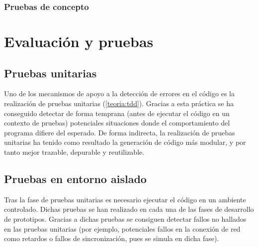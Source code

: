 

\subsubsection{Pruebas de concepto}
\citationneeded[TODO]



\section{Evaluación y pruebas}
\label{chapter:evaluaciones}

\subsection{Pruebas unitarias}

Uno de los mecanismos de apoyo a la detección de errores en el código es la realización de pruebas unitarias (\ref{teoria:tdd}). Gracias a esta práctica se ha conseguido detectar de forma temprana (antes de ejecutar el código en un contexto de pruebas) potenciales situaciones donde el comportamiento del programa difiere del esperado. De forma indirecta, la realización de pruebas unitarias ha tenido como resultado la generación de código más modular, y por tanto mejor trazable, depurable y reutilizable.

\subsection{Pruebas en entorno aislado}

Tras la fase de pruebas unitarias es necesario ejecutar el código en un ambiente controlado. Dichas pruebas se han realizado en cada una de las fases de desarrollo de prototipos. Gracias a dichas pruebas se consiguen detectar fallos no hallados en las pruebas unitarias (por ejemplo, potenciales fallos en la conexión de red como retardos o fallos de sincronización, pues se simula en dicha fase).

